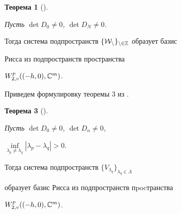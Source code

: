  


\label{end} 


 








{\bf Теорема 1} (\cite{11}). {\it Пусть $\det D_0\ne0$, $\det D_N\ne0$. 


 


Тогда система подпространств $\{\cal W_n\}_{n\in\Bbb Z}$ образует базис 


Рисса из подпространств пространства 


$W^p_{2,v}((-h,0),\Bbb C^m)$. 


} 


\medskip 





Приведем формулировку теоремы 3 из \cite{11}. 


\medskip 


 


{\bf Теорема 3} (\cite{11}). {\it Пусть $\det D_0\ne0$, $\det D_n\ne0$, 


$\inf\limits_{\lambda_p\ne\lambda_q}|\lambda_p-\lambda_q|>0$. 


Тогда система подпространств $\{V_{\lambda_q}\}_{\lambda_q\in\Lambda}$ 


образует базис Рисса из подпространств пpocтранства 


$W^p_{2,v}((-h,0),\Bbb C^m)$. 


} 


\medskip 


